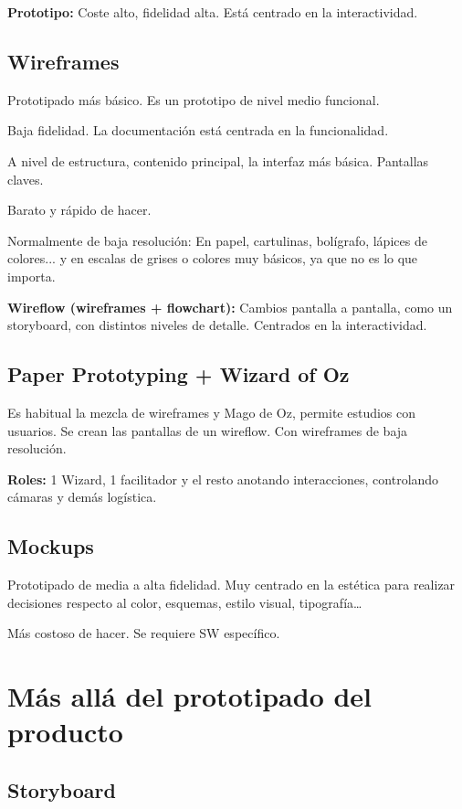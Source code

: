 \documentclass[12pt, twoside, openright]{report} %
\begin{document}
\textbf{Prototipo:} Coste alto, fidelidad alta. Está centrado en la interactividad.

\subsection{Wireframes}

Prototipado más básico. Es un prototipo de nivel medio funcional.

Baja fidelidad. La documentación está centrada en la funcionalidad.

A nivel de estructura, contenido principal, la interfaz más básica.
Pantallas claves.

Barato y rápido de hacer.

Normalmente de baja resolución: En papel, cartulinas, bolígrafo, lápices de colores... y en escalas de grises o colores muy básicos, ya que no es lo que importa.

\textbf{Wireflow (wireframes + flowchart):} Cambios pantalla a pantalla, como un storyboard, con distintos niveles de detalle. Centrados en la interactividad.

\subsection{Paper Prototyping + Wizard of Oz}

Es habitual la mezcla de wireframes y Mago de Oz, permite estudios con usuarios.
Se crean las pantallas de un wireflow. Con wireframes de baja resolución.

\textbf{Roles:} 1 Wizard, 1 facilitador y el resto anotando interacciones, controlando cámaras y demás logística.

\subsection{Mockups}
Prototipado de media a alta fidelidad. Muy centrado en la estética para realizar decisiones respecto al color, esquemas, estilo visual, tipografía…

Más costoso de hacer. Se requiere SW específico.

\section{Más allá del prototipado del producto}
\subsection{Storyboard}
\end{document}
